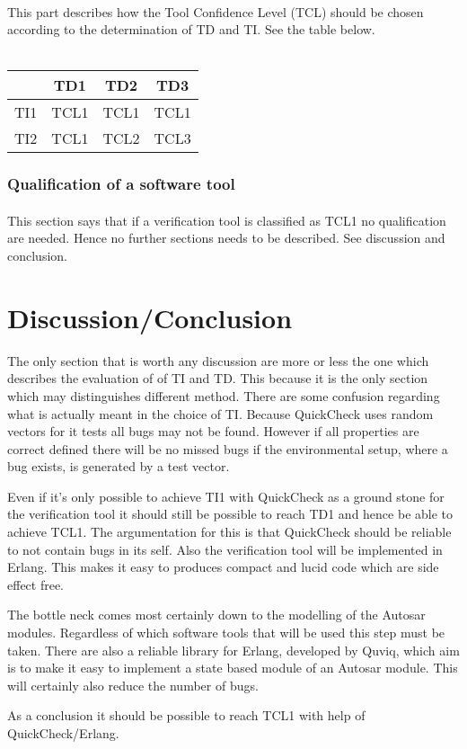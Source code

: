 \documentclass{article}
\begin{document}
\paragraph{}
This part describes how the Tool Confidence Level (TCL) should be chosen
according to
the determination of TD and TI. See the table below. \\\\
\begin{tabular}{c|c|c|c}
    & TD1  & TD2   & TD3  \\ \hline
TI1 & TCL1 & TCL1  & TCL1 \\ \hline
TI2 & TCL1 & TCL2  & TCL3 \\
\end{tabular}
\subsubsection{Qualification of a software tool}
\paragraph{}
This section says that if a verification tool is classified as TCL1 no
qualification are needed. Hence no further sections needs to be described. See
discussion and conclusion.
\setcounter{section}{\value{oldcounter}}

\section{Discussion/Conclusion}
The only section that is worth any discussion are more or less the one which
describes the evaluation of of TI and TD. This because it is the only section
which may distinguishes different method.  There are some confusion regarding
what is actually meant in the choice of TI. Because QuickCheck uses random
vectors for it tests all bugs may not be found. However if all properties are
correct defined there will be no missed bugs if the environmental setup, where a
bug exists, is generated by a test vector.

Even if it's only possible to achieve
TI1 with QuickCheck as a ground stone for the verification tool it should still
be possible to reach TD1 and hence be able to achieve TCL1. The argumentation
for this is that QuickCheck should be reliable to not contain bugs in its self.
Also the verification tool will be implemented in Erlang. This makes it easy to
produces compact and lucid code which are side effect free.

The bottle neck comes most certainly down to the modelling of the Autosar
modules. Regardless of which software tools that will be used this step must be
taken. There are also a reliable library for Erlang, developed by Quviq, which
aim is to make it easy to implement a state based module of an Autosar module.
This will certainly also reduce the number of bugs.

As a conclusion it should be possible to reach TCL1 with help of
QuickCheck/Erlang.
\end{document}
